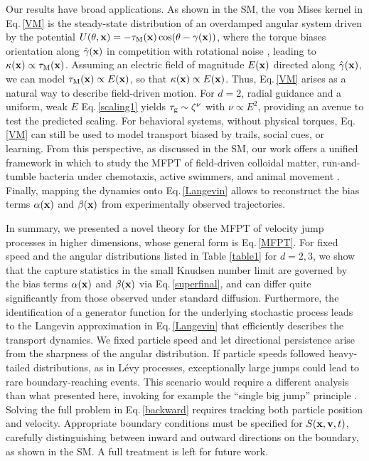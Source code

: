 \documentclass[
 reprint,










 amsmath,amssymb,
 aps, prl,






longbibliography
]{revtex4-2}
\newcommand\bx{ {\bf x}}
\begin{document}
Our results have broad applications. As shown in the SM, the von Mises kernel in Eq.\,\ref{VM}
is the steady-state distribution of an overdamped angular system driven by the
potential $U(\theta, {\bf x}) = - \tau_{\rm M}({\bf x})  \cos (\theta - \gamma({\bf x}))$,
where the torque biases orientation along $\hat \gamma({\bf x})$ in competition with
rotational noise \cite{Hofling2025}, leading to $\kappa({\bf x}) \propto \tau_{\rm M}({\bf x})$. Assuming an electric field of magnitude $E({\bf x})$ directed along $\hat \gamma({\bf x})$, we can model $\tau_{\rm M}({\bf x}) \propto E({\bf x})$,
so that $\kappa({\bf x}) \propto E({\bf x})$.
Thus, Eq.\,\ref{VM} arises as a natural way to describe field-driven motion.
For $d=2$, radial guidance and a uniform, weak $E$
Eq.\,\ref{scaling1} yields $\tau_{\rm g} \sim \zeta^{\nu}$ with $\nu \propto E^2$, providing an avenue to
test the predicted scaling. For behavioral systems, without physical torques, Eq.\,\ref{VM} can still be used to
model transport biased by trails, social cues, or learning.
From this perspective, as discussed in the SM, our work offers a unified framework
in which to study the MFPT of field-driven colloidal matter,  run-and-tumble bacteria under chemotaxis, active swimmers, and animal movement
\cite{Saito2025, Karani2019, Codutti2019, Popescu2018, Buness2024, Sourjik2012, Mlynarczyk2019, Nieuwenhuizen2004, McKenzie2009, Boissard2013, Lauga2006, Kummel2013, Schneirla1944, Narazaki2021, Wang2013}. Finally, mapping the dynamics onto Eq.\,\ref{Langevin}
allows to reconstruct the bias terms $\alpha({\bf{x}})$  and
$\beta({\bf x})$ from experimentally observed trajectories.

In summary, we presented a novel theory for the MFPT of velocity jump processes
in higher dimensions, whose general form is
Eq.\,\ref{MFPT}.  For fixed speed and the angular distributions
listed in Table \ref{table1} for $d=2,3$, we show that the capture statistics in the small Knudsen number limit are governed by the bias terms $\alpha(\bx)$ and $\beta(\bx)$ via Eq.\,\ref{superfinal}, and
can differ quite significantly
from those observed under standard diffusion. Furthermore, the identification of a generator function
for the underlying stochastic process leads to the Langevin approximation in Eq.\,\ref{Langevin}
that efficiently describes the transport dynamics.
We fixed particle speed and let directional persistence arise from the sharpness of the angular distribution. If particle speeds followed heavy-tailed distributions, as in L\'evy processes, exceptionally large jumps could lead to rare boundary-reaching events. This scenario would require a different analysis than what presented here, invoking for example the “single big jump” principle \cite{Vezzani2019}. Solving the full problem in Eq.\,\ref{backward} requires tracking both particle position and velocity. Appropriate boundary conditions must be specified for $S({\bf x}, {\bf v}, t)$, carefully distinguishing between inward and outward directions on the boundary, as shown in the SM. A full treatment is left for future work.
\end{document}
